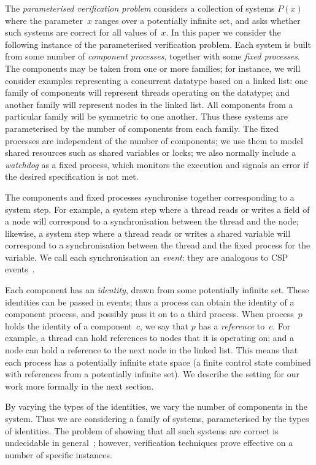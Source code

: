 The \emph{parameterised verification problem} considers a collection of
systems $P(x)$ where the parameter~$x$ ranges over a potentially infinite set,
and asks whether such systems are correct for all values of~$x$.  In this
paper we consider the following instance of the parameterised verification
problem.  Each system is built from some number of \emph{component processes},
together with some \emph{fixed processes}.  The components may be taken from
one or more families; for instance, we will consider examples representing a
concurrent datatype based on a linked list: one family of components will
represent threads operating on the datatype; and another family will represent
nodes in the linked list.  All components from a particular family will be
symmetric to one another.  Thus these systems are parameterised by the number
of components from each family.  The fixed processes are independent
of the number of components; we use them to model shared resources such as
shared variables or locks; we also normally include a \emph{watchdog} as a
fixed process, which monitors the execution and signals an error if the
desired specification is not met.

The components and fixed processes synchronise together corresponding to a
system step.  For example, a system step where a thread reads or writes a
field of a node will correspond to a synchronisation between the thread and
the node; likewise, a system step where a thread reads or writes a shared
variable will correspond to a synchronisation between the thread and the fixed
process for the variable.  We call each synchronisation an \emph{event}: they
are analogous to CSP events~\cite{awr:UCS}.

Each component has an \emph{identity}, drawn from some potentially infinite
set.  These identities can be passed in events; thus a process can obtain the
identity of a component process, and possibly pass it on to a third process.
When process~$p$ holds the identity of a component~$c$, we say that $p$ has a
\emph{reference} to~$c$.  For example, a thread can hold references to nodes
that it is operating on; and a node can hold a reference to the next node in
the linked list.  This means that each process has a potentially infinite
state space (a finite control state combined with references from a
potentially infinite set).  We describe the setting for our work more formally
in the next section.

By varying the types of the identities, we vary the number of components in the
system.  Thus we are considering a family of systems, parameterised by the
types of identities.  The problem of showing that all such systems are
correct is undecidable in general~\cite{apt-kozen,tomasz-gavin-CA}; however,
verification techniques prove effective on a number of specific instances.

